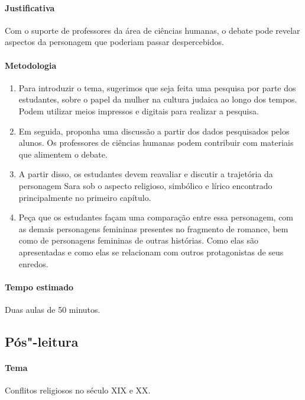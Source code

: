 \documentclass[12pt]{extarticle}
\begin{document}
\paragraph{Justificativa} Com o suporte de professores da área
de ciências humanas, o debate pode revelar aspectos da personagem
que poderiam passar despercebidos.

\paragraph{Metodologia}

\begin{enumerate}

\item Para introduzir o tema, sugerimos que seja feita uma 
pesquisa por parte dos estudantes, sobre o papel da mulher
na cultura judaica ao longo dos tempos. Podem utilizar 
meios impressos e digitais para realizar a pesquisa.

\item Em seguida, proponha uma discussão a partir dos dados
pesquisados pelos alunos. Os professores de ciências
humanas podem contribuir com materiais que alimentem o debate. 

\item A partir disso, os estudantes devem reavaliar e discutir a
trajetória da personagem Sara sob o
aspecto religioso, simbólico e lírico encontrado principalmente no
primeiro capítulo.

\item Peça que os estudantes façam uma comparação entre essa personagem, com as
demais personagens femininas presentes no fragmento de romance, bem como
de  personagens femininas de outras histórias. Como elas são
apresentadas e como elas se relacionam com outros protagonistas de seus
enredos.

\end{enumerate}

\paragraph{Tempo estimado} Duas aulas de 50 minutos.
   


\subsection{Pós"-leitura}


\paragraph{Tema} Conflitos religiosos no século XIX e XX.
\end{document}
